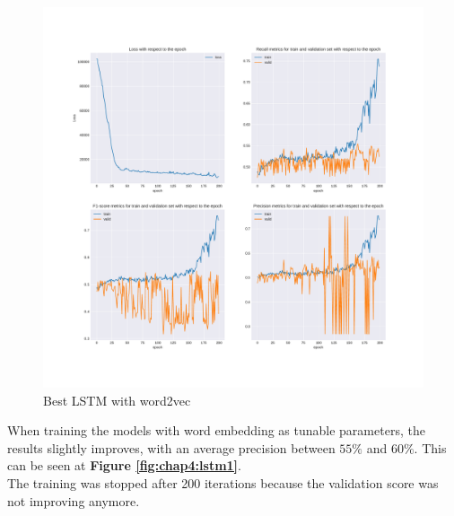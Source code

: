 \begin{figure}
	\centering
	\includegraphics[width=\textwidth]{images/chapitre4/lstm2}
	\caption{Best LSTM with word2vec}
	\label{fig:chap4:lstm2}
\end{figure}

When training the models with word embedding as tunable parameters, the results slightly improves, with an average precision between $55\%$ and $60\%$. This can be seen at \textbf{Figure \ref{fig:chap4:lstm1}}. \\

The training was stopped after 200 iterations because the validation score was not improving anymore. 

